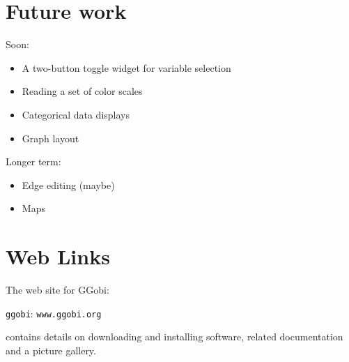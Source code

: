 \documentclass[11pt]{article}
\begin{document}
\section{Future work}

Soon:

\begin{itemize}
\item A two-button toggle widget for variable selection
\item Reading a set of color scales
\item Categorical data displays
\item Graph layout
\end{itemize}

Longer term:

\begin{itemize}
\item Edge editing (maybe)
\item Maps
\end{itemize}

\section*{Web Links}

The web site for GGobi:

\centerline{{\tt ggobi}: {\tt www.ggobi.org}}

contains details on downloading and installing software, related
documentation and a picture gallery.

\newpage

\end{document}
